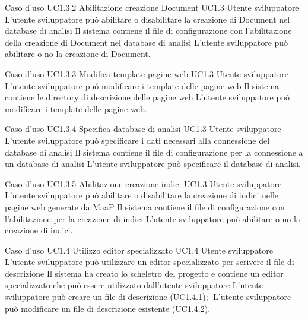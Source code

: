 \UCtitle
{Caso d'uso UC1.3.2}
{Abilitazione creazione Document}
\UC
{UC1.3}
{Utente sviluppatore}
{L'utente sviluppatore può abilitare o disabilitare la creazione di Document nel database di analisi}
{Il sistema contiene il file di configurazione con l'abilitazione della creazione di Document nel database di analisi}
\scenario
{L'utente sviluppatore può abilitare o no la creazione di Document.}

\UCtitle
{Caso d'uso UC1.3.3}
{Modifica template pagine web}
\UC
{UC1.3}
{Utente sviluppatore}
{L'utente sviluppatore pu\'o modificare i template delle pagine web}
{Il sistema contiene le directory di descrizione delle pagine web}
\scenario
{L'utente sviluppatore pu\'o modificare i template delle pagine web.}

\UCtitle
{Caso d'uso UC1.3.4}
{Specifica database di analisi}
\UC
{UC1.3}
{Utente sviluppatore}
{L'utente sviluppatore può specificare i dati necessari alla connessione del database di analisi}
{Il sistema contiene il file di configurazione per la connessione a un database di analisi}
\scenario
{L'utente sviluppatore può specificare il database di analisi.}

\UCtitle
{Caso d'uso UC1.3.5}
{Abilitazione creazione indici}
\UC
{UC1.3}
{Utente sviluppatore}
{L'utente sviluppatore può abilitare o disabilitare la creazione di indici nelle pagine web generate da MaaP}
{Il sistema contiene il file di configurazione con l'abilitazione per la creazione di indici}
\scenario
{L'utente sviluppatore può abilitare o no la creazione di indici.}

\UCtitle
{Caso d'uso UC1.4}
{Utilizzo editor specializzato}
\UC
{UC1.4}
{Utente sviluppatore}
{L'utente sviluppatore può utilizzare un editor specializzato per scrivere il file di descrizione}
{Il sistema ha creato lo scheletro del progetto e contiene un editor specializzato che può essere utilizzato dall'utente sviluppatore}
\scenario
{L'utente sviluppatore può creare un file di descrizione (UC1.4.1);|
L'utente sviluppatore può modificare un file di descrizione esistente (UC1.4.2).
}

